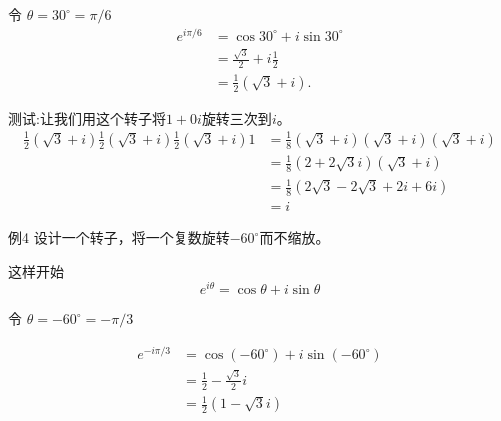 令 $\theta=30^{\circ}=\pi / 6$
$$
\begin{aligned}
e^{i \pi / 6} & =\cos 30^{\circ}+i \sin 30^{\circ} \\
& =\frac{\sqrt{3}}{2}+i \frac{1}{2} \\
& =\frac{1}{2}(\sqrt{3}+i) .
\end{aligned}
$$

测试:让我们用这个转子将$1+0 i$旋转三次到$i$。
$$
\begin{aligned}
\frac{1}{2}(\sqrt{3}+i) \frac{1}{2}(\sqrt{3}+i) \frac{1}{2}(\sqrt{3}+i) 1 & =\frac{1}{8}(\sqrt{3}+i)(\sqrt{3}+i)(\sqrt{3}+i) \\
& =\frac{1}{8}(2+2 \sqrt{3} i)(\sqrt{3}+i) \\
& =\frac{1}{8}(2 \sqrt{3}-2 \sqrt{3}+2 i+6 i) \\
& =i
\end{aligned}
$$

例4 设计一个转子，将一个复数旋转$-60^{\circ}$而不缩放。

这样开始
$$
e^{i \theta}=\cos \theta+i \sin \theta
$$

令 $\theta=-60^{\circ}=-\pi / 3$

$$
\begin{aligned}
e^{-i \pi / 3} & =\cos \left(-60^{\circ}\right)+i \sin \left(-60^{\circ}\right) \\
& =\frac{1}{2}-\frac{\sqrt{3}}{2} i \\
& =\frac{1}{2}(1-\sqrt{3} i)
\end{aligned}
$$
